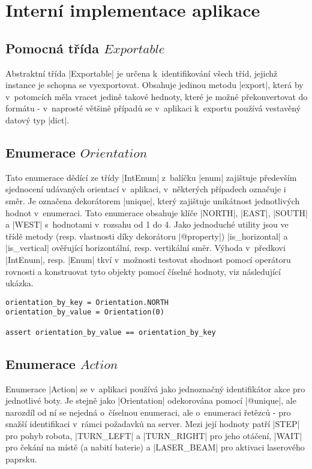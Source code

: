 \section{Interní implementace aplikace}
\label{sec:implementation}

\subsection{Pomocná třída $Exportable$}

Abstraktní třída \ic|Exportable| je určena k~identifikování všech tříd, jejichž instance je schopna se vyexportovat. Obsahuje jedinou metodu \ic|export|, která by v~potomcích měla vracet jedině takové hednoty, které je možné překonvertovat do formátu  - v~naprosté většině případů se v~aplikaci k~exportu používá vestavěný datový typ \ic|dict|.

\subsection{Enumerace $Orientation$}

Tato enumerace dědící ze třídy \ic|IntEnum| z~balíčku \ic|enum| zajištuje především sjednocení udávaných orientací v~aplikaci, v~některých případech označuje i směr. Je označena dekorátorem \ic|unique|, který zajištuje unikátnost jednotlivých hodnot v~enumeraci. Tato enumerace obsahuje klíče \ic|NORTH|, \ic|EAST|, \ic|SOUTH| a \ic|WEST| s~hodnotami v~rozsahu od 1 do 4. Jako jednoduché utility jsou ve třídě metody (resp. vlastnosti díky dekorátoru \ic|@property|) \ic|is_horizontal| a \ic|is_vertical| ověřující horizontální, resp. vertikální směr. Výhoda v~předkovi \ic|IntEnum|, resp. \ic|Enum| tkví v~možnosti testovat shodnost pomocí operátoru rovnosti a konstruovat tyto objekty pomocí číselné hodnoty, viz následující ukázka.

\begin{lstlisting}[caption={Výhody třídy $Enum$}]
orientation_by_key = Orientation.NORTH
orientation_by_value = Orientation(0)

assert orientation_by_value == orientation_by_key
\end{lstlisting}

\subsection{Enumerace $Action$}
\label{subsec:action-enum}
Enumerace \ic|Action| se v~aplikaci používá jako jednoznačný identifikátor akce pro jednotlivé boty. Je stejně jako \ic|Orientation| odekorována pomocí \ic|@unique|, ale narozdíl od ní se nejedná o~číselnou enumeraci, ale o~enumeraci řetězců - pro snažší identifikaci v~rámci požadavků na server.
Mezi její hodnoty patří \ic|STEP| pro pohyb robota, \ic|TURN_LEFT| a \ic|TURN_RIGHT| pro jeho otáčení, \ic|WAIT| pro čekání na místě (a nabití baterie) a \ic|LASER_BEAM| pro aktivaci laserového paprsku.

